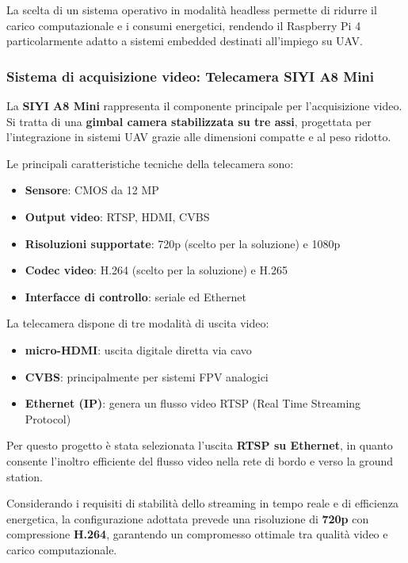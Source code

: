 La scelta di un sistema operativo in modalità headless permette di ridurre il carico computazionale e i consumi energetici, rendendo il Raspberry Pi 4 particolarmente adatto a sistemi embedded destinati all’impiego su UAV.

\subsubsection{Sistema di acquisizione video: Telecamera SIYI A8 Mini}

La \textbf{SIYI A8 Mini}\cite{siyi_manual} rappresenta il componente principale per l’acquisizione video. Si tratta di una \textbf{gimbal camera stabilizzata su tre assi}, progettata per l’integrazione in sistemi UAV grazie alle dimensioni compatte e al peso ridotto.

Le principali caratteristiche tecniche della telecamera sono:
\begin{itemize}
    \item \textbf{Sensore}: CMOS da 12 MP
    \item \textbf{Output video}: RTSP, HDMI, CVBS
    \item \textbf{Risoluzioni supportate}: 720p (scelto per la soluzione) e 1080p
    \item \textbf{Codec video}: H.264 (scelto per la soluzione) e H.265 
    \item \textbf{Interfacce di controllo}: seriale ed Ethernet
\end{itemize}

La telecamera dispone di tre modalità di uscita video:
\begin{itemize}
    \item \textbf{micro-HDMI}: uscita digitale diretta via cavo
    \item \textbf{CVBS}: principalmente per sistemi FPV analogici
    \item \textbf{Ethernet (IP)}: genera un flusso video RTSP (Real Time Streaming Protocol)
\end{itemize}

Per questo progetto è stata selezionata l’uscita \textbf{RTSP su Ethernet}, in quanto consente l’inoltro efficiente del flusso video nella rete di bordo e verso la ground station.  

Considerando i requisiti di stabilità dello streaming in tempo reale e di efficienza energetica, la configurazione adottata prevede una risoluzione di \textbf{720p} con compressione \textbf{H.264}, garantendo un compromesso ottimale tra qualità video e carico computazionale.

